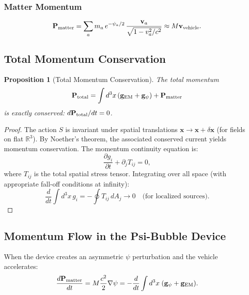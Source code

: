 \documentclass[aps,prd,twocolumn,superscriptaddress,floatfix,nofootinbib]{revtex4-2}
\newtheorem{proposition}{Proposition}
\begin{document}
\subsubsection{Matter Momentum}

\begin{equation}
\mathbf{P}_{\rm matter} = \sum_a m_a\,e^{-\psi_a/2}\,
\frac{\mathbf{v}_a}{\sqrt{1-v_a^2/c^2}}
\approx M\mathbf{v}_{\rm vehicle}.
\label{eq:P-matter}
\end{equation}

\subsection{Total Momentum Conservation}

\begin{proposition}[Total Momentum Conservation]
The total momentum
\begin{equation}
\mathbf{P}_{\rm total} = \int d^3x\,(\mathbf{g}_{\rm EM}
+ \mathbf{g}_\psi) + \mathbf{P}_{\rm matter}
\label{eq:P-total}
\end{equation}
is exactly conserved: $d\mathbf{P}_{\rm total}/dt = 0$.
\end{proposition}

\begin{proof}
The action $S$ is invariant under spatial translations
$\mathbf{x} \to \mathbf{x} + \delta\mathbf{x}$ (for fields on flat
$\mathbb{R}^3$). By Noether's theorem, the associated conserved current
yields momentum conservation. The momentum continuity equation is:
\begin{equation}
\frac{\partial g_i}{\partial t} + \partial_j T_{ij} = 0,
\end{equation}
where $T_{ij}$ is the total spatial stress tensor. Integrating over all
space (with appropriate fall-off conditions at infinity):
\begin{equation}
\frac{d}{dt}\int d^3x\,g_i = -\oint T_{ij}\,dA_j \to 0
\quad\text{(for localized sources)}.
\end{equation}
\end{proof}

\subsection{Momentum Flow in the Psi-Bubble Device}

When the device creates an asymmetric $\psi$ perturbation and the
vehicle accelerates:
\begin{equation}
\frac{d\mathbf{P}_{\rm matter}}{dt} = M\frac{c^2}{2}\nabla\psi
= -\frac{d}{dt}\int d^3x\;(\mathbf{g}_\psi + \mathbf{g}_{\rm EM}).
\label{eq:momentum-balance}
\end{equation}
\end{document}
